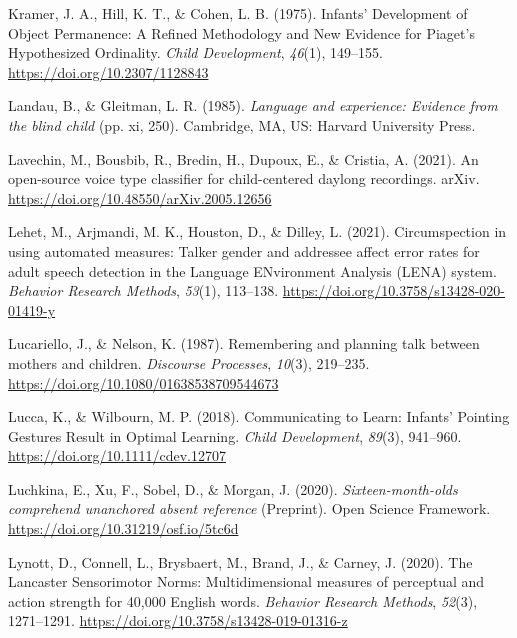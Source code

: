 \documentclass[
  man,floatsintext]{apa6}
\newlength{\cslhangindent}
\newlength{\cslentryspacingunit} %
\newenvironment{CSLReferences}[2] %
 {%
  \setlength{\parindent}{0pt}
  \ifodd #1
  \let\oldpar\par
  \def\par{\hangindent=\cslhangindent\oldpar}
  \fi
  \setlength{\parskip}{#2\cslentryspacingunit}
 }%
 {}
\begin{document}
\begin{CSLReferences}{1}{0}
\leavevmode{}%
Kramer, J. A., Hill, K. T., \& Cohen, L. B. (1975). Infants' {Development} of {Object Permanence}: {A Refined Methodology} and {New Evidence} for {Piaget}'s {Hypothesized Ordinality}. \emph{Child Development}, \emph{46}(1), 149--155. \url{https://doi.org/10.2307/1128843}

\leavevmode{}%
Landau, B., \& Gleitman, L. R. (1985). \emph{Language and experience: {Evidence} from the blind child} (pp. xi, 250). {Cambridge, MA, US}: {Harvard University Press}.

\leavevmode{}%
Lavechin, M., Bousbib, R., Bredin, H., Dupoux, E., \& Cristia, A. (2021). An open-source voice type classifier for child-centered daylong recordings. {arXiv}. \url{https://doi.org/10.48550/arXiv.2005.12656}

\leavevmode{}%
Lehet, M., Arjmandi, M. K., Houston, D., \& Dilley, L. (2021). Circumspection in using automated measures: {Talker} gender and addressee affect error rates for adult speech detection in the {Language ENvironment Analysis} ({LENA}) system. \emph{Behavior Research Methods}, \emph{53}(1), 113--138. \url{https://doi.org/10.3758/s13428-020-01419-y}

\leavevmode{}%
Lucariello, J., \& Nelson, K. (1987). Remembering and planning talk between mothers and children. \emph{Discourse Processes}, \emph{10}(3), 219--235. \url{https://doi.org/10.1080/01638538709544673}

\leavevmode{}%
Lucca, K., \& Wilbourn, M. P. (2018). Communicating to {Learn}: {Infants}' {Pointing Gestures Result} in {Optimal Learning}. \emph{Child Development}, \emph{89}(3), 941--960. \url{https://doi.org/10.1111/cdev.12707}

\leavevmode{}%
Luchkina, E., Xu, F., Sobel, D., \& Morgan, J. (2020). \emph{Sixteen-month-olds comprehend unanchored absent reference} (Preprint). {Open Science Framework}. \url{https://doi.org/10.31219/osf.io/5tc6d}

\leavevmode{}%
Lynott, D., Connell, L., Brysbaert, M., Brand, J., \& Carney, J. (2020). The {Lancaster Sensorimotor Norms}: Multidimensional measures of perceptual and action strength for 40,000 {English} words. \emph{Behavior Research Methods}, \emph{52}(3), 1271--1291. \url{https://doi.org/10.3758/s13428-019-01316-z}


\end{CSLReferences}
\end{document}
